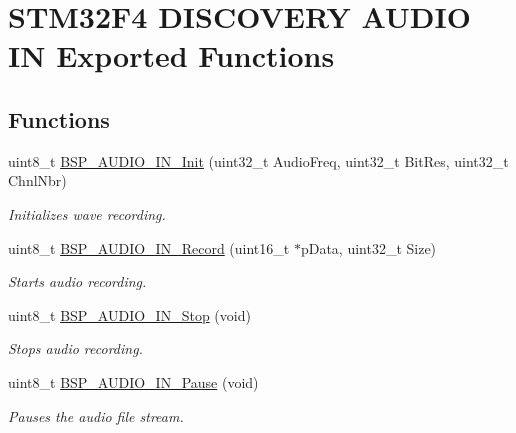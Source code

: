 \hypertarget{group___s_t_m32_f4___d_i_s_c_o_v_e_r_y___a_u_d_i_o___i_n___exported___functions}{}\section{S\+T\+M32\+F4 D\+I\+S\+C\+O\+V\+E\+RY A\+U\+D\+IO IN Exported Functions}
\label{group___s_t_m32_f4___d_i_s_c_o_v_e_r_y___a_u_d_i_o___i_n___exported___functions}
\subsection*{Functions}
\begin{DoxyCompactItemize}
\item 
uint8\+\_\+t \mbox{\hyperlink{group___s_t_m32_f4___d_i_s_c_o_v_e_r_y___a_u_d_i_o___i_n___exported___functions_ga5a40f0d40f80fd71fd16fbb4e7fb3b7d}{B\+S\+P\+\_\+\+A\+U\+D\+I\+O\+\_\+\+I\+N\+\_\+\+Init}} (uint32\+\_\+t Audio\+Freq, uint32\+\_\+t Bit\+Res, uint32\+\_\+t Chnl\+Nbr)
\begin{DoxyCompactList}\small\item\em Initializes wave recording. \end{DoxyCompactList}\item 
uint8\+\_\+t \mbox{\hyperlink{group___s_t_m32_f4___d_i_s_c_o_v_e_r_y___a_u_d_i_o___i_n___exported___functions_gaae6c101b1450ec26a15249494764e0ae}{B\+S\+P\+\_\+\+A\+U\+D\+I\+O\+\_\+\+I\+N\+\_\+\+Record}} (uint16\+\_\+t $\ast$p\+Data, uint32\+\_\+t Size)
\begin{DoxyCompactList}\small\item\em Starts audio recording. \end{DoxyCompactList}\item 
uint8\+\_\+t \mbox{\hyperlink{group___s_t_m32_f4___d_i_s_c_o_v_e_r_y___a_u_d_i_o___i_n___exported___functions_ga71122b966773b01c8a5933c76f3f12fe}{B\+S\+P\+\_\+\+A\+U\+D\+I\+O\+\_\+\+I\+N\+\_\+\+Stop}} (void)
\begin{DoxyCompactList}\small\item\em Stops audio recording. \end{DoxyCompactList}\item 
uint8\+\_\+t \mbox{\hyperlink{group___s_t_m32_f4___d_i_s_c_o_v_e_r_y___a_u_d_i_o___i_n___exported___functions_gac1df7a4be23f378f89e25685a2266247}{B\+S\+P\+\_\+\+A\+U\+D\+I\+O\+\_\+\+I\+N\+\_\+\+Pause}} (void)
\begin{DoxyCompactList}\small\item\em Pauses the audio file stream. \end{DoxyCompactList}\item 

\end{DoxyCompactItemize}
